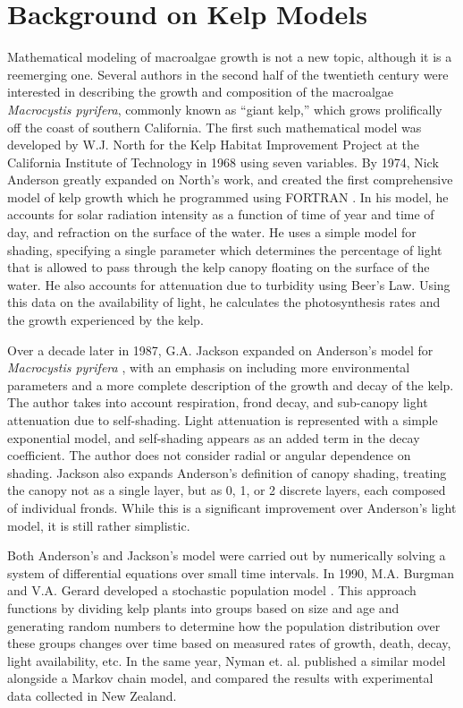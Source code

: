 \section{Background on Kelp Models}

Mathematical modeling of macroalgae growth is not a new topic, although it is a reemerging one.
Several authors in the second half of the twentieth century were interested in describing the growth and composition of the macroalgae \textit{Macrocystis pyrifera}, commonly known as ``giant kelp,'' which grows prolifically off the coast of southern California.
The first such mathematical model was developed by W.J. North for the Kelp Habitat Improvement Project at the California Institute of Technology in 1968 using seven variables.
By 1974, Nick Anderson greatly expanded on North's work, and created the first comprehensive model of kelp growth which he programmed using FORTRAN \cite{anderson_mathematical_1974}.
In his model, he accounts for solar radiation intensity as a function of time of year and time of day, and refraction on the surface of the water.
He uses a simple model for shading, specifying a single parameter which determines the percentage of light that is allowed to pass through the kelp canopy floating on the surface of the water.
He also accounts for attenuation due to turbidity using Beer's Law.
Using this data on the availability of light, he calculates the photosynthesis rates and the growth experienced by the kelp.

Over a decade later in 1987, G.A.
Jackson expanded on Anderson's model for \textit{Macrocystis pyrifera} \cite{jackson_modelling_1987}, with an emphasis on including more environmental parameters and a more complete description of the growth and decay of the kelp.
The author takes into account respiration, frond decay, and sub-canopy light attenuation due to self-shading.
Light attenuation is represented with a simple exponential model, and self-shading appears as an added term in the decay coefficient.
The author does not consider radial or angular dependence on shading.
Jackson also expands Anderson's definition of canopy shading, treating the canopy not as a single layer, but as 0, 1, or 2 discrete layers, each composed of individual fronds.
While this is a significant improvement over Anderson's light model, it is still rather simplistic.

Both Anderson's and Jackson's model were carried out by numerically solving a system of differential equations over small time intervals.
In 1990, M.A. Burgman and V.A. Gerard developed a stochastic population model \cite{burgman_stage-structured_1990}.
This approach functions by dividing kelp plants into groups based on size and age and generating random numbers to determine how the population distribution over these groups changes over time based on measured rates of growth, death, decay, light availability, etc.
In the same year, Nyman et. al. \cite{nyman_macrocystis_1990} published a similar model alongside a Markov chain model, and compared the results with experimental data collected in New Zealand.

